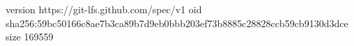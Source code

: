 version https://git-lfs.github.com/spec/v1
oid sha256:59bc50166c8ae7b3ca89b7d9eb0bbb203ef73b8885c28828ccb59cb9130d3dce
size 169559
